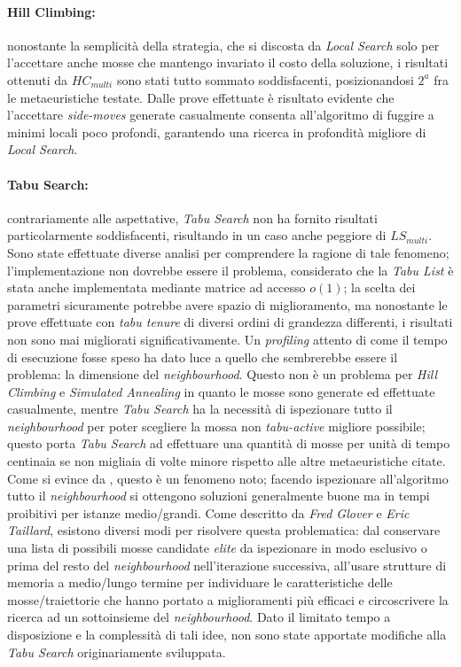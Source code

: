 \documentclass[]{article}
\begin{document}
\paragraph{Hill Climbing:} nonostante la semplicità della strategia, che si discosta da \textit{Local Search} solo per l'accettare anche mosse che mantengo invariato il costo della soluzione, i risultati ottenuti da $HC_{multi}$  sono stati tutto sommato soddisfacenti, posizionandosi $2^a$ fra le metaeuristiche testate. Dalle prove effettuate è risultato evidente che l'accettare \textit{side-moves} generate casualmente consenta all'algoritmo di fuggire a minimi locali poco profondi, garantendo una ricerca in profondità migliore di \textit{Local Search}.

\paragraph{Tabu Search:} contrariamente alle aspettative, \textit{Tabu Search} non ha fornito risultati particolarmente soddisfacenti, risultando in un caso anche peggiore di $LS_{multi}$. Sono state effettuate diverse analisi per comprendere la ragione di tale fenomeno; l'implementazione non dovrebbe essere il problema, considerato che la \textit{Tabu List} è stata anche implementata mediante  matrice ad accesso $o(1)$; la scelta dei parametri sicuramente potrebbe avere spazio di miglioramento, ma nonostante le prove effettuate con \textit{tabu tenure} di diversi ordini di grandezza differenti, i risultati non sono mai migliorati significativamente. Un \textit{profiling} attento di come il tempo di esecuzione fosse speso ha dato luce a quello che sembrerebbe essere il problema: la dimensione del \textit{neighbourhood}. Questo non è un problema per \textit{Hill Climbing} e \textit{Simulated Annealing} in quanto le mosse sono generate ed effettuate casualmente, mentre \textit{Tabu Search} ha la necessità di ispezionare tutto il \textit{neighbourhood} per poter scegliere la mossa non \textit{tabu-active} migliore possibile; questo porta \textit{Tabu Search} ad effettuare una quantità di mosse per unità di tempo centinaia se non migliaia di volte minore rispetto alle altre metaeuristiche citate. Come si evince da \cite{bib:tabu-search-guide}, questo è un fenomeno noto; facendo ispezionare all'algoritmo tutto il \textit{neighbourhood} si ottengono soluzioni generalmente buone ma in tempi proibitivi per istanze medio/grandi. Come descritto da \textit{Fred Glover} e \textit{Eric Taillard}, esistono diversi modi per risolvere questa problematica: dal conservare una lista di possibili mosse candidate \textit{elite} da ispezionare in modo esclusivo o prima del resto del \textit{neighbourhood} nell'iterazione successiva, all'usare strutture di memoria a medio/lungo termine per individuare le caratteristiche delle mosse/traiettorie che hanno portato a miglioramenti più efficaci e circoscrivere la ricerca ad un sottoinsieme del \textit{neighbourhood}. Dato il limitato tempo a disposizione e la complessità di tali idee, non sono state apportate modifiche alla \textit{Tabu Search} originariamente sviluppata.
\end{document}
